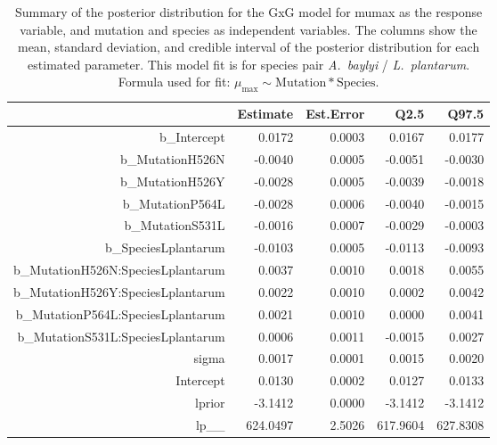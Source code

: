 \begin{table}[ht]
\centering
\begin{tabular}{rrrrr}
  \hline
 & Estimate & Est.Error & Q2.5 & Q97.5 \\ 
  \hline
b\_Intercept & 0.0172 & 0.0003 & 0.0167 & 0.0177 \\ 
  b\_MutationH526N & -0.0040 & 0.0005 & -0.0051 & -0.0030 \\ 
  b\_MutationH526Y & -0.0028 & 0.0005 & -0.0039 & -0.0018 \\ 
  b\_MutationP564L & -0.0028 & 0.0006 & -0.0040 & -0.0015 \\ 
  b\_MutationS531L & -0.0016 & 0.0007 & -0.0029 & -0.0003 \\ 
  b\_SpeciesLplantarum & -0.0103 & 0.0005 & -0.0113 & -0.0093 \\ 
  b\_MutationH526N:SpeciesLplantarum & 0.0037 & 0.0010 & 0.0018 & 0.0055 \\ 
  b\_MutationH526Y:SpeciesLplantarum & 0.0022 & 0.0010 & 0.0002 & 0.0042 \\ 
  b\_MutationP564L:SpeciesLplantarum & 0.0021 & 0.0010 & 0.0000 & 0.0041 \\ 
  b\_MutationS531L:SpeciesLplantarum & 0.0006 & 0.0011 & -0.0015 & 0.0027 \\ 
  sigma & 0.0017 & 0.0001 & 0.0015 & 0.0020 \\ 
  Intercept & 0.0130 & 0.0002 & 0.0127 & 0.0133 \\ 
  lprior & -3.1412 & 0.0000 & -3.1412 & -3.1412 \\ 
  lp\_\_ & 624.0497 & 2.5026 & 617.9604 & 627.8308 \\ 
   \hline
\end{tabular}
\caption{Summary of the posterior distribution for the GxG model for mumax as the response variable, and mutation and species as independent variables. The columns show the mean, standard deviation, and credible interval of the posterior distribution for each estimated parameter. This model fit is for species pair \textit{A.~baylyi} / \textit{L.~plantarum}.  Formula used for fit: $\mu_{\text{max}} \sim \text{Mutation} * \text{Species}$.} 
\label{supptab:GxG_mumax_AB_LP}
\end{table}



